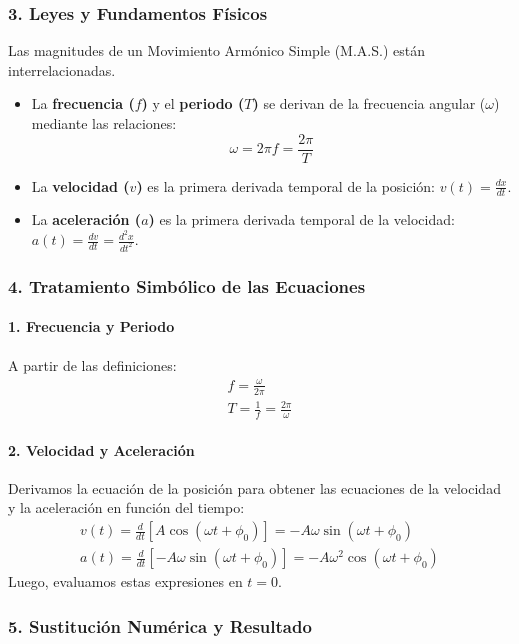 \subsubsection*{3. Leyes y Fundamentos Físicos}
Las magnitudes de un Movimiento Armónico Simple (M.A.S.) están interrelacionadas.
\begin{itemize}
    \item La \textbf{frecuencia ($f$)} y el \textbf{periodo ($T$)} se derivan de la frecuencia angular ($\omega$) mediante las relaciones:
    $$ \omega = 2\pi f = \frac{2\pi}{T} $$
    \item La \textbf{velocidad ($v$)} es la primera derivada temporal de la posición: $v(t) = \frac{dx}{dt}$.
    \item La \textbf{aceleración ($a$)} es la primera derivada temporal de la velocidad: $a(t) = \frac{dv}{dt} = \frac{d^2x}{dt^2}$.
\end{itemize}

\subsubsection*{4. Tratamiento Simbólico de las Ecuaciones}
\paragraph{1. Frecuencia y Periodo}
A partir de las definiciones:
\begin{gather}
    f = \frac{\omega}{2\pi} \\
    T = \frac{1}{f} = \frac{2\pi}{\omega}
\end{gather}
\paragraph{2. Velocidad y Aceleración}
Derivamos la ecuación de la posición para obtener las ecuaciones de la velocidad y la aceleración en función del tiempo:
\begin{gather}
    v(t) = \frac{d}{dt} [A \cos(\omega t + \phi_0)] = -A\omega \sin(\omega t + \phi_0) \\
    a(t) = \frac{d}{dt} [-A\omega \sin(\omega t + \phi_0)] = -A\omega^2 \cos(\omega t + \phi_0)
\end{gather}
Luego, evaluamos estas expresiones en $t=0$.

\subsubsection*{5. Sustitución Numérica y Resultado}
